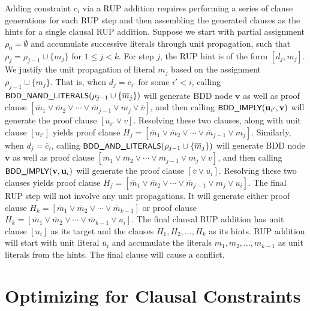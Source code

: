 \documentclass{easychair}
\renewcommand{\obar}[1]{\overline{#1}}
\newcommand{\mlit}{m}
\newcommand{\assign}{\rho}
\newcommand{\fname}[1]{\mbox{\small\sf #1}}
\newcommand{\node}[1]{\mathbf{#1}}
\newcommand{\nodeu}{\node{u}}
\newcommand{\nodev}{\node{v}}
\begin{document}
Adding constraint $c_i$ via a RUP addition requires
performing a series of clause generations for each RUP step and then assembling the generated clauses as the hints for a single clausal RUP addition.
Suppose we start with partial assignment $\assign_0 = \emptyset$
and accumulate successive literals through unit
propagation, such that $\assign_j = \assign_{j-1} \cup \{ \mlit_j \}$ for $1 \leq j < k$.
For step $j$, the RUP hint is of the form $[d_j, \mlit_j]$.  We
justify the unit propagation of literal $\mlit_j$ based on the
assignment
$\assign_{j-1} \cup \{ \obar{\mlit}_{j} \}$.
That is, when $d_j = c_{i'}$ for some $i' < i$, calling
$\fname{BDD\_NAND\_LITERALS}(\assign_{j-1} \cup \{ \obar{\mlit}_j \})$ will generate BDD node $\nodev$
as well as proof clause
$[\obar{\mlit}_1 \lor \obar{\mlit}_2 \lor \cdots \lor  \obar{\mlit}_{j-1} \lor \mlit_j \lor \obar{v}]$,
and then calling $\fname{BDD\_IMPLY}(\nodeu_{i'}, \nodev)$
  will generate the proof clause $[\obar{u}_{i'} \lor v]$.  Resolving these two clauses, along with unit clause $[u_{i'}]$
yields proof clause
$H_j = [\obar{\mlit}_1 \lor  \obar{\mlit}_2 \lor \cdots \lor \obar{\mlit}_{j-1} \lor \mlit_j]$.
  Similarly, when
$d_j = \overline{c}_i$, calling
$\fname{BDD\_AND\_LITERALS}(\assign_{j-1} \cup \{ \obar{\mlit}_j \})$ will generate BDD node $\nodev$
as well as proof clause
$[\obar{\mlit}_1 \lor \obar{\mlit}_2 \lor \cdots \lor  \obar{\mlit}_{j-1} \lor \mlit_j \lor v]$,
and then calling $\fname{BDD\_IMPLY}(\nodev, \nodeu_i)$
  will generate the proof clause $[\obar{v} \lor u_i]$.  Resolving these two clauses
yields proof clause
$H_j = [\obar{\mlit}_1 \lor  \obar{\mlit}_2 \lor \cdots \lor \obar{\mlit}_{j-1} \lor \mlit_j \lor u_i]$.
The final RUP step will not involve any unit propagations.  It will generate either proof clause
$H_k = [\obar{\mlit}_1 \lor  \obar{\mlit}_2 \lor \cdots \lor \obar{\mlit}_{k-1}]$ or proof clause
$H_k = [\obar{\mlit}_1 \lor  \obar{\mlit}_2 \lor \cdots \lor \obar{\mlit}_{k-1} \lor u_i]$.
The
final clausal RUP addition has unit clause $[u_i]$ as its target
and the clauses $H_1, H_2, \ldots, H_k$ as its hints.
RUP addition will start with unit literal $\obar{u}_i$ and accumulate the literals 
$\mlit_1, \mlit_2, \ldots, \mlit_{k-1}$ as unit literals from the hints.
The final clause will cause a conflict.

\section{Optimizing for Clausal Constraints}
\end{document}

